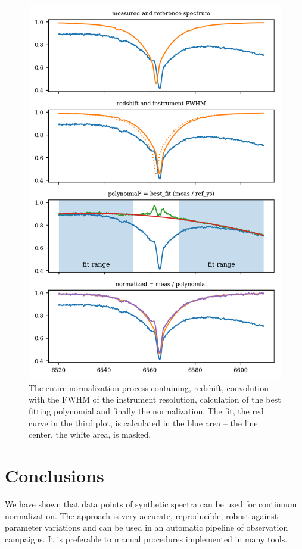 \documentclass[10pt,a4paper,notitlepage,twocolumn]{article}
\begin{document}
\begin{figure}[ht]
	\includegraphics[width=\columnwidth]{img/normalize_howto_4x1.png}
	\caption{The entire normalization process containing, redshift, convolution with the FWHM of the instrument resolution, calculation of the best fitting polynomial and finally the normalization. The fit, the red curve in the third plot, is calculated in the blue area -- the line center, the white area, is masked.}
	\label{normalize_howto}
\end{figure}


\section{Conclusions}

We have shown that data points of synthetic spectra can be used for continuum normalization. The approach is very accurate, reproducible, robust against parameter variations and can be used in an automatic pipeline of observation campaigns.
It is preferable to manual procedures implemented in many tools.
\end{document}
